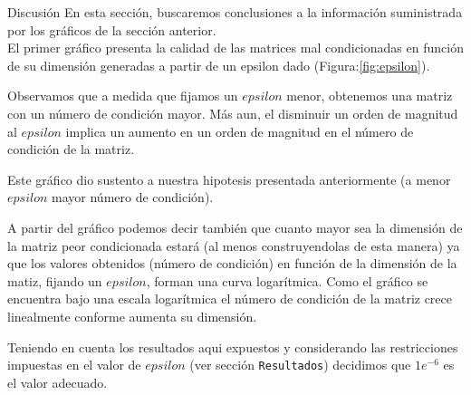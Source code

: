 \begin{section}{Discusión}
	En esta sección, buscaremos conclusiones a la información suministrada por los gráficos de la sección anterior.\\
	
	El primer gráfico presenta la calidad de las matrices mal condicionadas en función de su dimensión generadas a 
	partir de un epsilon dado (Figura:\ref{fig:epsilon}).
	
	Observamos que a medida que fijamos un $epsilon$ menor, obtenemos una matriz con un número de condición mayor. 
	Más aun, el disminuir un orden de magnitud al $epsilon$ implica un aumento en un orden de magnitud en el número
	 de condición de la matriz.
	
	Este gráfico dio sustento a nuestra hipotesis presentada anteriormente (a menor $epsilon$ mayor número de 
	condición).
	
	A partir del gráfico podemos decir también que cuanto mayor sea la dimensión de la  matriz peor condicionada 
	estará (al menos construyendolas de esta manera) ya que los valores obtenidos (número de condición) en función 
	de la dimensión de la matiz, fijando un $epsilon$, forman una curva logarítmica. Como el gráfico se encuentra 
	bajo una escala logarítmica el número de condición de la matriz crece linealmente conforme aumenta su dimensión.
	
	Teniendo en cuenta los resultados aqui expuestos y considerando las restricciones impuestas en el valor de 
	$epsilon$ (ver sección \texttt{Resultados}) decidimos que $1e^{-6}$ es el valor adecuado.
\end{section}

